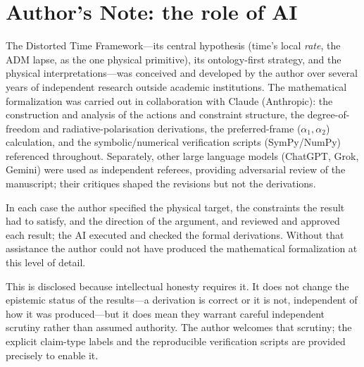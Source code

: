 \documentclass[11pt]{article}
\begin{document}
\section*{Author's Note: the role of AI}
{\small
The Distorted Time Framework---its central hypothesis (time's local \emph{rate}, the ADM lapse,
as the one physical primitive), its ontology-first strategy, and the physical
interpretations---was conceived and developed by the author over several years of independent
research outside academic institutions. The mathematical formalization was carried out in
collaboration with Claude (Anthropic): the construction and analysis of the actions and constraint
structure, the degree-of-freedom and radiative-polarisation derivations, the preferred-frame
($\alpha_1,\alpha_2$) calculation, and the symbolic/numerical verification scripts (SymPy/NumPy)
referenced throughout. Separately, other large language models (ChatGPT, Grok, Gemini) were used as
independent referees, providing adversarial review of the manuscript; their critiques shaped the
revisions but not the derivations.

In each case the author specified the physical target, the constraints the result had to satisfy,
and the direction of the argument, and reviewed and approved each result; the AI executed and
checked the formal derivations. Without that assistance the author could not have produced the
mathematical formalization at this level of detail.

This is disclosed because intellectual honesty requires it. It does not change the epistemic status
of the results---a derivation is correct or it is not, independent of how it was produced---but it
does mean they warrant careful independent scrutiny rather than assumed authority. The author
welcomes that scrutiny; the explicit claim-type labels and the reproducible verification scripts are
provided precisely to enable it.
\par}
\end{document}
